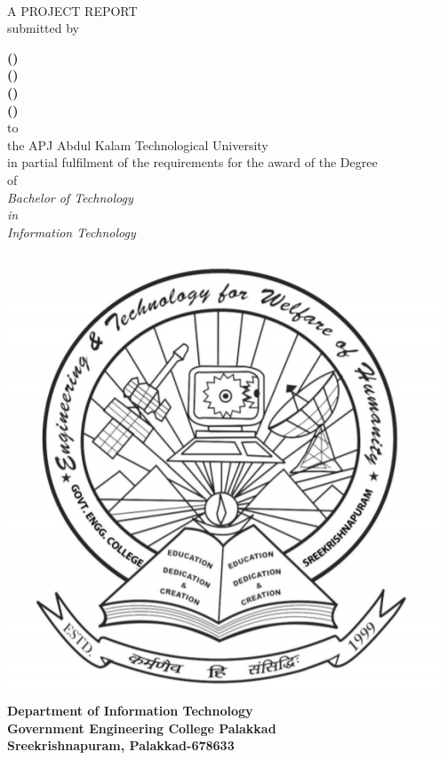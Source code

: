\begin{titlepage}
  \begin{center}
    \textbf{\Large\cTitle}\\
    \vfill
    A PROJECT REPORT\\
    \vfill
    submitted by\\
    \vfill
    
    \textbf{\MakeUppercase{\cMembOne (\cMembOneRegNo)} } \\
    \textbf{\MakeUppercase{\cMembTwo (\cMembTwoRegNo)} } \\
    \textbf{\MakeUppercase{\cMembThree (\cMembThreeRegNo)} } \\
    \textbf{\MakeUppercase{\cMembFour (\cMembFourRegNo)}  } \\
    
    \vfill
    to\\
    the APJ Abdul Kalam Technological University\\
    \vfill
    in partial fulfilment of the requirements for the award of the Degree\\
    of\\
    \emph{
        Bachelor of Technology\\
        in\\
        Information Technology
    }
    \vfill
    \includegraphics[scale=.3]{"covers/images/logo_gecp.png"}
    \vfill
    \textbf{Department of Information Technology\\
      Government Engineering College Palakkad\\
      Sreekrishnapuram, Palakkad-678633}\\
    \cMonthAndYear
  \end{center}
  \restoregeometry
\end{titlepage}